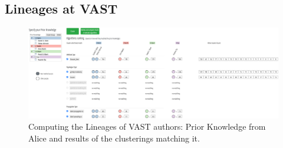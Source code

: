

\subsection{Lineages at VAST}
\label{sud:VAST}

\begin{figure}[tb]
\centering
\includegraphics[width=\linewidth]{static/figures/PK-Clustering/VISPaperFigures/Vast_PK_Clustering_View.png}
\caption{Computing the Lineages of VAST authors: Prior Knowledge from Alice and results of the clusterings matching it.}
\label{fig:PK-Vast_PK_Clustering_View}
\end{figure}

